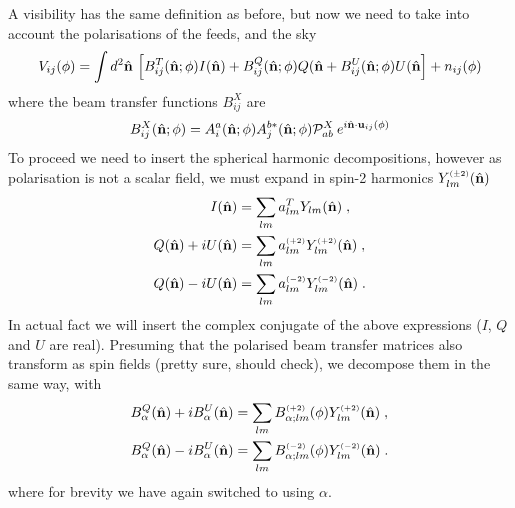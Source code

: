 \documentclass{revtex4}
\begin{document}
A visibility has the same definition as before, but now we need to take into
account the polarisations of the feeds, and the sky
\begin{equation}
\label{eq:vispol}
V_{ij}(\phi) = \int d^2\hat{\mathbf{n}} \, \left[ B^T_{ij}(\hat{\mathbf{n}}; \phi) I(\hat{\mathbf{n}}) +
  B^Q_{ij}(\hat{\mathbf{n}}; \phi) Q(\hat{\mathbf{n}} + B^U_{ij}(\hat{\mathbf{n}}; \phi) U(\hat{\mathbf{n}} \right]+ n_{ij}(\phi)
\end{equation}
where the beam transfer functions $B^X_{ij}$ are
\begin{equation}
B^X_{ij}(\hat{\mathbf{n}}; \phi) = A_i^a(\hat{\mathbf{n}}; \phi) A_j^{b *}(\hat{\mathbf{n}}; \phi)
\mathcal{P}^X_{ab} \:e^{i \hat{\mathbf{n}} \cdot
  \mathbf{u}_{ij}(\phi)} 
\end{equation}
To proceed we need to insert the spherical harmonic decompositions, however as
polarisation is not a scalar field, we must expand in spin-2 harmonics
$Y_{lm}^{\scriptscriptstyle \left(\pm 2\right)}(\hat{\mathbf{n}})$
\begin{align}
I(\hat{\mathbf{n}}) & = \sum_{lm} a^T_{lm} Y_{lm}(\hat{\mathbf{n}}) \; ,\\
Q(\hat{\mathbf{n}}) + i U(\hat{\mathbf{n}}) & = \sum_{lm} a^{\scriptscriptstyle \left(+2\right)}_{lm}
Y^{\scriptscriptstyle \left(+2\right)}_{lm}(\hat{\mathbf{n}}) \; ,\\
Q(\hat{\mathbf{n}}) - i U(\hat{\mathbf{n}}) & = \sum_{lm} a^{\scriptscriptstyle \left(-2\right)}_{lm}
Y^{\scriptscriptstyle \left(-2\right)}_{lm}(\hat{\mathbf{n}}) \; .
\end{align}
In actual fact we will insert the complex conjugate of the above expressions
($I$, $Q$ and $U$ are real). Presuming that the polarised beam transfer matrices
also transform as spin fields (pretty sure, should check), we decompose them in
the same way, with
\begin{align}
B^Q_{\alpha}(\hat{\mathbf{n}}) + i B^U_{\alpha}(\hat{\mathbf{n}}) & = \sum_{lm}
B^{\scriptscriptstyle \left(+2\right)}_{\alpha;lm} (\phi)
Y^{\scriptscriptstyle \left(+2\right)}_{lm}(\hat{\mathbf{n}}) \; ,\\
B^Q_{\alpha}(\hat{\mathbf{n}}) - i B^U_{\alpha}(\hat{\mathbf{n}}) & = \sum_{lm}
B^{\scriptscriptstyle \left(-2\right)}_{\alpha;lm} (\phi)
Y^{\scriptscriptstyle \left(-2\right)}_{lm}(\hat{\mathbf{n}}) \; .
\end{align}
where for brevity we have again switched to using $\alpha$.
\end{document}

